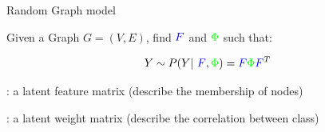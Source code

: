 \begin{frame}[t]{Random Graph model}

Given a Graph $G=(V,E)$, find $\textcolor{blue}{F}$ and $\textcolor{green}{\Phi}$ such that:

\begin{equation*}
    Y \sim P(Y | \textcolor{blue}{F}, \textcolor{green}{\Phi}) = \textcolor{blue}{F}\textcolor{green}{\Phi} \textcolor{blue}{F}^T
\end{equation*}


\begin{description}
\setlength{\itemindent}{-2cm}
\item[\textcolor{blue}{$F$}]: a latent feature matrix (describe the membership of nodes)
\item[\textcolor{green}{$\Phi$}]: a latent weight matrix (describe the correlation between class)
\end{description}

\pause



\end{frame}
